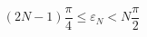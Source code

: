 \begin{equation}
\left( 2N-1\right) \frac{\pi }{4}\leq \varepsilon _{N}<N\frac{\pi }{2}
\label{eq110b}
\end{equation}

